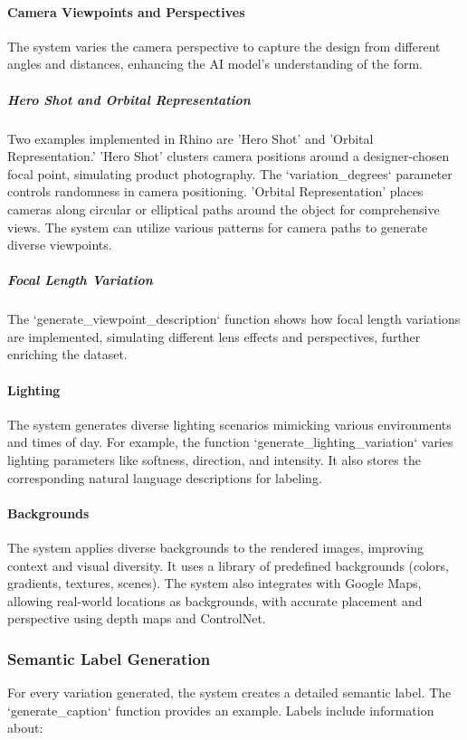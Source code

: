 \documentclass[12pt]{report}
\begin{document}
\paragraph{Camera Viewpoints and Perspectives}
The system varies the camera perspective to capture the design from different angles and distances, enhancing the AI model's understanding of the form.

\subparagraph{Hero Shot and Orbital Representation}
Two examples implemented in Rhino are 'Hero Shot' and 'Orbital Representation.'  'Hero Shot' clusters camera positions around a designer-chosen focal point, simulating product photography. The `variation_degrees` parameter controls randomness in camera positioning. 'Orbital Representation' places cameras along circular or elliptical paths around the object for comprehensive views. The system can utilize various patterns for camera paths to generate diverse viewpoints.

\subparagraph{Focal Length Variation}
The `generate_viewpoint_description` function shows how focal length variations are implemented, simulating different lens effects and perspectives, further enriching the dataset.

\paragraph{Lighting}
The system generates diverse lighting scenarios mimicking various environments and times of day.  For example, the function `generate_lighting_variation` varies lighting parameters like softness, direction, and intensity. It also stores the corresponding natural language descriptions for labeling.

\paragraph{Backgrounds}
The system applies diverse backgrounds to the rendered images, improving context and visual diversity. It uses a library of predefined backgrounds (colors, gradients, textures, scenes). The system also integrates with Google Maps, allowing real-world locations as backgrounds, with accurate placement and perspective using depth maps and ControlNet.

\subsubsection{Semantic Label Generation}
For every variation generated, the system creates a detailed semantic label. The `generate_caption` function provides an example.  Labels include information about:
\end{document}
